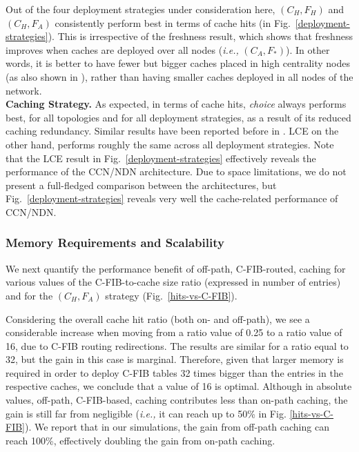 \documentclass{sig-alternate}
\newcommand{\ie}{{\em i.e.,\/ }}
\begin{document}
Out of the four deployment strategies under consideration here, $\left(C_{H}, F_{H} \right)$ and $\left(C_{H}, F_{A} \right)$ consistently perform best in terms of cache hits (in Fig.~\ref{deployment-strategies}). This is irrespective of the freshness result, which shows that freshness improves when caches are deployed over all nodes (\ie $\left(C_{A}, F_{*} \right)$). In other words, it is better to have fewer but bigger caches placed in high centrality nodes (as also shown in \cite{clam-comcom}), rather than having smaller caches deployed in all nodes of the network. 
\\[0.2cm]
\textbf{Caching Strategy.}
As expected, in terms of cache hits, \textit{choice} always performs best, for all topologies and for all deployment strategies, as a result of its reduced caching redundancy. Similar results have been reported before in \cite{probcache-tpds}. LCE on the other hand, performs roughly the same across all deployment strategies. Note that the LCE result in Fig.~\ref{deployment-strategies} effectively reveals the performance of the CCN/NDN architecture. Due to space limitations, we do not present a full-fledged comparison between the architectures, but Fig.~\ref{deployment-strategies} reveals very well the cache-related performance of CCN/NDN.





\subsubsection{Memory Requirements and Scalability}

We next quantify the performance benefit of off-path, C-FIB-routed, caching for various values of the C-FIB-to-cache size ratio (expressed in number of entries) and for the $\left(C_{H}, F_{A} \right)$ strategy (Fig.~\ref{hits-vs-C-FIB}).

Considering the overall cache hit ratio (both on- and off-path), we see a considerable increase when moving from a ratio value of 0.25 to a ratio value of 16, due to C-FIB routing 
redirections. The results are similar for a ratio equal to 32, but the gain in this case is marginal. 
Therefore, given that larger memory is required in order to deploy C-FIB tables 32 times bigger than the entries in the respective caches, we conclude that a value of 16 is optimal.
Although in absolute values, off-path, 
C-FIB-based, caching contributes less than on-path caching, the gain is still far from negligible (\ie it can reach up to 50\% in Fig. \ref{hits-vs-C-FIB}).
We report that in our simulations, the gain from off-path caching can reach 100\%, effectively doubling the gain from on-path caching.
\end{document}
